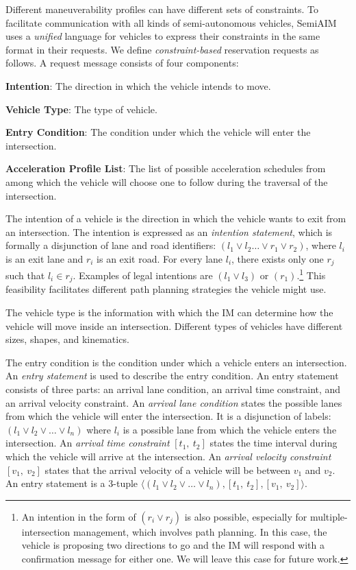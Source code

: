 Different maneuverability profiles can have different sets of
constraints.  To facilitate communication with all kinds of
semi-autonomous vehicles, SemiAIM uses a \emph{unified}
language for vehicles to express their constraints in the same format
in their requests.  We define \emph{constraint-based} reservation
requests as follows.  A request message consists of four components:
\begin{compactenum}
\item{\bf Intention}: The direction in which the vehicle intends to
  move.
\item{\bf Vehicle Type}: The type of vehicle.
\item{\bf Entry Condition}: The condition under which the vehicle
  will enter the intersection.
\item{\bf Acceleration Profile List}: The list of possible acceleration schedules
  from among which the vehicle will choose one to follow
  during the traversal of the intersection.
\end{compactenum}
The intention of a vehicle is the direction in which the vehicle wants
to exit from an intersection.  The intention is expressed as an
\emph{intention statement}, which is formally a disjunction of lane
and road identifiers: $(l_1 \vee l_2 \ldots \vee r_1 \vee r_2)$, where
$l_i$ is an exit lane and $r_i$ is an exit road. For every lane $l_i$,
there exists only one $r_j$ such that $l_i \in r_j$. 
Examples of legal intentions are $(l_1 \vee l_3)$ or
$(r_1)$.\footnote{An intention in the form of $(r_i \vee r_j)$ is also possible,
especially for multiple-intersection management, which involves path
planning. In this case, the vehicle is proposing two directions to go
and the IM will respond with a confirmation message for either one. We
will leave this case for future work.}
This feasibility facilitates different path planning strategies the
vehicle might use.

The vehicle type is the information with which the IM can
determine how the vehicle will move inside an intersection.  Different
types of vehicles have different sizes, shapes, and kinematics.

The entry condition is the condition under which a vehicle enters an
intersection.  An \emph{entry statement} is used to describe the entry
condition. An entry statement consists of three parts: an arrival
lane condition, an arrival time constraint, and an arrival velocity
constraint.  An \emph{arrival lane condition} states the possible lanes
from which the vehicle will enter the intersection.  It is a disjunction of
labels: $(l_1 \vee l_2 \vee \ldots \vee l_n)$ where $l_i$ is a
possible lane from which the vehicle enters the intersection.  An
\emph{arrival time constraint} $[t_1,\ t_2]$ states the time interval
during which the vehicle will arrive at the intersection.  An \emph{arrival
velocity constraint} $[v_1,\ v_2]$ states that the arrival velocity of
a vehicle will be between $v_1$ and $v_2$.  An entry statement is a
$3$-tuple $\langle (l_1 \vee l_2 \vee \ldots \vee l_n), [t_1,\ t_2],
[v_1,\ v_2] \rangle$.

